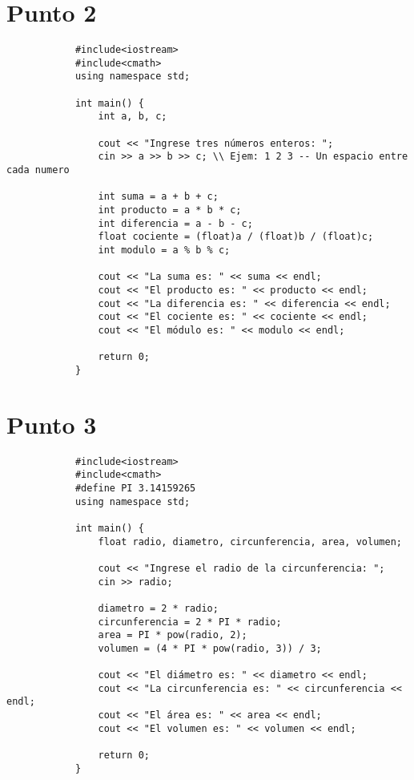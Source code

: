 \documentclass[10pt]{article}
\begin{document}
    \section*{Punto 2}
        \begin{verbatim}
            #include<iostream>
            #include<cmath>
            using namespace std;

            int main() {
                int a, b, c;

                cout << "Ingrese tres números enteros: ";
                cin >> a >> b >> c; \\ Ejem: 1 2 3 -- Un espacio entre cada numero

                int suma = a + b + c;
                int producto = a * b * c;
                int diferencia = a - b - c;
                float cociente = (float)a / (float)b / (float)c;
                int modulo = a % b % c;

                cout << "La suma es: " << suma << endl;
                cout << "El producto es: " << producto << endl;
                cout << "La diferencia es: " << diferencia << endl;
                cout << "El cociente es: " << cociente << endl;
                cout << "El módulo es: " << modulo << endl;

                return 0;
            }
        \end{verbatim}
        
    
    \section*{Punto 3}
        \begin{verbatim}
            #include<iostream>
            #include<cmath>
            #define PI 3.14159265
            using namespace std;
            
            int main() {
                float radio, diametro, circunferencia, area, volumen;
            
                cout << "Ingrese el radio de la circunferencia: ";
                cin >> radio;
            
                diametro = 2 * radio;
                circunferencia = 2 * PI * radio;
                area = PI * pow(radio, 2);
                volumen = (4 * PI * pow(radio, 3)) / 3;
            
                cout << "El diámetro es: " << diametro << endl;
                cout << "La circunferencia es: " << circunferencia << endl;
                cout << "El área es: " << area << endl;
                cout << "El volumen es: " << volumen << endl;
                
                return 0;
            }
        \end{verbatim}
    
\end{document}

